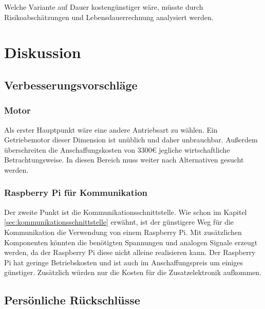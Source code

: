 Welche Variante auf Dauer kostengünstiger wäre, müsste durch Risikoabschätzungen und Lebensdauerrechnung analysiert werden. 


\newpage

\section{Diskussion}
\label{sec:diskussion}

\subsection{Verbesserungsvorschläge}
\label{sec:verbesserungsvorschläge}

\subsubsection{Motor}
\label{sec:verbesserungMotor}

Als erster Hauptpunkt wäre eine andere Antriebsart zu wählen. Ein Getriebemotor dieser Dimension  ist unüblich und daher unbrauchbar. Außerdem überschreiten die Anschaffungskosten von 3300€ jegliche wirtschaftliche Betrachtungsweise. In diesen Bereich muss weiter nach Alternativen gesucht werden. 

\subsubsection{Raspberry Pi für Kommunikation}
\label{sec:raspberryPiKommunikation}

Der zweite Punkt ist die Kommunikationsschnittstelle. Wie schon im Kapitel \ref{sec:kommunikationsschnittstelle} erwähnt, ist der günstigere Weg für die Kommunikation die Verwendung von einem Raspberry Pi. Mit zusätzlichen Komponenten könnten die benötigten Spannungen und analogen Signale erzeugt werden, da der Raspberry Pi diese nicht alleine realisieren kann. Der Raspberry Pi hat geringe Betriebskosten und ist auch im Anschaffungspreis um einiges günstiger. Zusätzlich würden nur die Kosten für die Zusatzelektronik aufkommen. 

\subsection{Persönliche Rückschlüsse}
\label{sec:persönlicheRückschlüsse}

